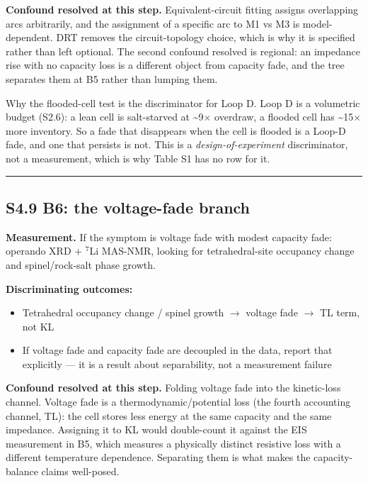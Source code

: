 \documentclass[11pt,a4paper]{article}
\begin{document}
\textbf{Confound resolved at this step.} Equivalent-circuit fitting assigns overlapping arcs arbitrarily, and the assignment of a specific arc to M1 vs M3 is model-dependent. DRT removes the circuit-topology choice, which is why it is specified rather than left optional. The second confound resolved is regional: an impedance rise with no capacity loss is a different object from capacity fade, and the tree separates them at B5 rather than lumping them.


Why the flooded-cell test is the discriminator for Loop D. Loop D is a volumetric budget (S2.6): a lean cell is salt-starved at \textasciitilde{}9\ensuremath{\times} overdraw, a flooded cell has \textasciitilde{}15\ensuremath{\times} more inventory. So a fade that disappears when the cell is flooded is a Loop-D fade, and one that persists is not. This is a \emph{design-of-experiment} discriminator, not a measurement, which is why Table S1 has no row for it.


\par\noindent\rule{\linewidth}{0.4pt}\par


\subsection*{S4.9 B6: the voltage-fade branch}


\textbf{Measurement.} If the symptom is voltage fade with modest capacity fade: operando XRD + \ensuremath{^{7}}Li MAS-NMR, looking for tetrahedral-site occupancy change and spinel/rock-salt phase growth.


\textbf{Discriminating outcomes:}


\begin{itemize}
  \item Tetrahedral occupancy change / spinel growth \ensuremath{\rightarrow} voltage fade \ensuremath{\rightarrow} TL term, not KL
  \item If voltage fade and capacity fade are decoupled in the data, report that explicitly --- it is a result about separability, not a measurement failure
\end{itemize}


\textbf{Confound resolved at this step.} Folding voltage fade into the kinetic-loss channel. Voltage fade is a thermodynamic/potential loss (the fourth accounting channel, TL): the cell stores less energy at the same capacity and the same impedance. Assigning it to KL would double-count it against the EIS measurement in B5, which measures a physically distinct resistive loss with a different temperature dependence. Separating them is what makes the capacity-balance claims well-posed.
\end{document}
